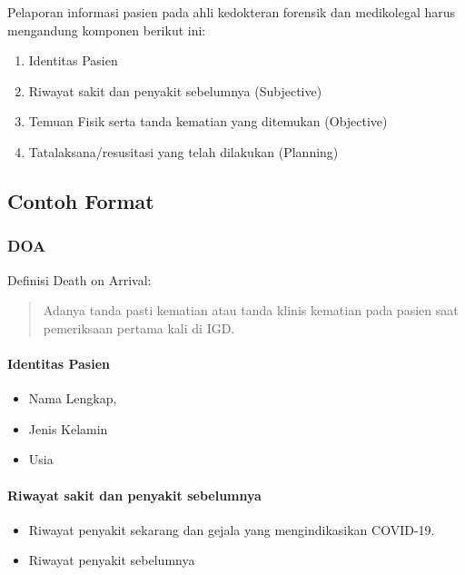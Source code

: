 \documentclass[
]{book}
\begin{document}
Pelaporan informasi pasien pada ahli kedokteran forensik dan medikolegal harus mengandung komponen berikut ini:

\begin{enumerate}
\def\labelenumi{\arabic{enumi}.}
\item
  Identitas Pasien
\item
  Riwayat sakit dan penyakit sebelumnya (Subjective)
\item
  Temuan Fisik serta tanda kematian yang ditemukan (Objective)
\item
  Tatalaksana/resusitasi yang telah dilakukan (Planning)
\end{enumerate}

\hypertarget{contoh-format-10}{%
\subsection{Contoh Format}\label{contoh-format-10}}

\hypertarget{doa}{%
\subsubsection{DOA}\label{doa}}

Definisi Death on Arrival:

\begin{quote}
Adanya tanda pasti kematian atau tanda klinis kematian pada pasien saat pemeriksaan pertama kali di IGD.
\end{quote}

\hypertarget{identitas-pasien}{%
\paragraph{Identitas Pasien}\label{identitas-pasien}}

\begin{itemize}
\item
  Nama Lengkap,
\item
  Jenis Kelamin
\item
  Usia
\end{itemize}

\hypertarget{riwayat-sakit-dan-penyakit-sebelumnya}{%
\paragraph{Riwayat sakit dan penyakit sebelumnya}\label{riwayat-sakit-dan-penyakit-sebelumnya}}

\begin{itemize}
\item
  Riwayat penyakit sekarang dan gejala yang mengindikasikan COVID-19.
\item
  Riwayat penyakit sebelumnya
\end{itemize}
\end{document}
